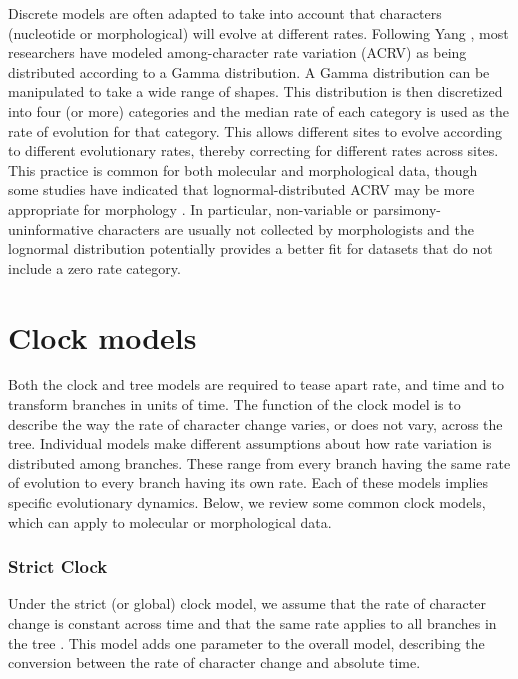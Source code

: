 Discrete models are often adapted to take into account that characters (nucleotide or morphological) will evolve at different rates. Following Yang \citep{Yang1994a}, 
most researchers have modeled among-character rate variation (ACRV) as being distributed according to a Gamma distribution.
A Gamma distribution can be manipulated to take a wide range of shapes.
This distribution is then discretized into four (or more) categories and the median rate of each category is used as the rate of evolution for that category.
This allows different sites to evolve according to different evolutionary rates, thereby correcting for different rates across sites.
This practice is common for both molecular and morphological data, though some studies have indicated that lognormal-distributed ACRV may be more appropriate for morphology \citep{wagner2011, Harrison2015}. %
In particular, non-variable or parsimony-uninformative  characters are usually not collected by morphologists and the lognormal distribution potentially provides a better fit for datasets that do not include a zero rate category.


\section{Clock models}
Both the clock and tree models are required to tease apart rate, and time and to transform branches in units of time.
The function of the clock model is to describe the way the rate of character change varies, or does not vary, across the tree.
Individual models make different assumptions about how rate variation is distributed among branches.
These range from  every branch having the same rate of evolution to every branch having its own rate.
Each of these models implies specific evolutionary dynamics.
Below, we review some common clock models, which can apply to molecular or morphological data.

\subsubsection{Strict Clock}
Under the strict (or global) clock model, we assume that the rate of character change is constant across time and that the same rate applies to all branches in the tree \citep{Zuckerkandl1962, Zuckerkandl1965EvolutionaryDivergenceConvergence}.
This model adds one parameter to the overall model, describing the conversion between the rate of character change  and absolute time.

